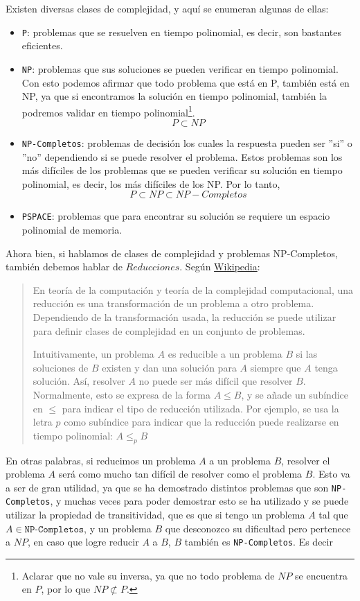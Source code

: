 Existen diversas clases de complejidad, y aquí se enumeran algunas de ellas:
\begin{itemize}
	\item \texttt{P}: problemas que se resuelven en tiempo polinomial, es decir, son bastantes eficientes.
	\item \texttt{NP}: problemas que sus soluciones se pueden verificar en tiempo polinomial. Con esto podemos afirmar que todo problema que está en P, también está en NP, ya que si encontramos la solución en tiempo polinomial, también la podremos validar en tiempo polinomial\footnote{Aclarar que no vale su inversa, ya que no todo problema de $NP$ se encuentra en $P$, por lo que $NP \not\subset  P$.}.
    \[ P \subset NP\]
	\item \texttt{NP-Completos}: problemas de decisión los cuales la respuesta pueden ser ''si'' o ''no'' dependiendo si se puede resolver el problema. Estos problemas son los más difíciles de los problemas que se pueden verificar su solución en tiempo polinomial, es decir, los más difíciles de los NP.
    Por lo tanto,
    \[ P \subset NP \subset NP-Completos\]
	\item \texttt{PSPACE}: problemas que para encontrar su solución se requiere un espacio polinomial de memoria.
\end{itemize}
Ahora bien, si hablamos de clases de complejidad y problemas NP-Completos, también debemos hablar de $Reducciones$. Según \href{https://es.wikipedia.org/wiki/Reducci%C3%B3n_(complejidad)}{Wikipedia}:
\begin{quote}
    En teoría de la computación y teoría de la complejidad computacional, una reducción es una transformación de un problema a otro problema. Dependiendo de la transformación usada, la reducción se puede utilizar para definir clases de complejidad en un conjunto de problemas.

    Intuitivamente, un problema $A$ es reducible a un problema $B$ si las soluciones de $B$ existen y dan una solución para $A$ siempre que $A$ tenga solución. Así, resolver $A$ no puede ser más difícil que resolver $B$. Normalmente, esto se expresa de la forma $A \leq B$, y se añade un subíndice en $\le$ para indicar el tipo de reducción utilizada. Por ejemplo, se usa la letra $p$ como subíndice para indicar que la reducción puede realizarse en tiempo polinomial: $A \leq _p B$
\end{quote}

En otras palabras, si reducimos un problema $A$ a un problema $B$, resolver el problema $A$ será como mucho tan difícil de resolver como el problema $B$. Esto va a ser de gran utilidad, ya que se ha demostrado distintos problemas que son \texttt{NP-Completos}, y muchas veces para poder demostrar esto se ha utilizado y se puede utilizar la propiedad de transitividad, que es que si tengo un problema $A$ tal que $A \in \texttt{NP-Completos}$, y un problema $B$ que desconozco su dificultad pero pertenece a $NP$, en caso que logre reducir $A$ a $B$, $B$ también es \texttt{NP-Completos}. Es decir

